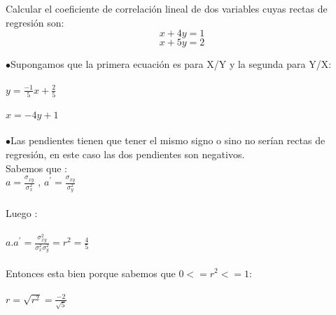 \problem
Calcular el coeficiente de correlaci\'on lineal de dos variables cuyas rectas de regresi\'on son:
$$
x + 4y = 1
$$
$$
x + 5y = 2
$$
	
	$\bullet$Supongamos que la primera ecuación es para X/Y y la segunda para Y/X:\\ \\
	$y = \frac{-1}{5}x + \frac{2}{5}$\\ \\
	$x = -4y + 1$\\ \\
	$\bullet$Las pendientes tienen que tener el mismo signo o sino no serían rectas de regresión, en este caso las dos pendientes son negativos.\\ 
	Sabemos que : \\
	
	
	$a = \frac{\sigma_{xy}}{\sigma_{x}^{2}} $ , $a^{'} = \frac{\sigma_{xy}}{\sigma_{y}^{2}} $\\ \\
	Luego :\\ \\
	$a.a^{'} = \frac{\sigma_{xy}^{2}}{\sigma_{x}^{2}\sigma_{y}^{2}} = r^{2} = \frac{4}{5} $\\ \\
	Entonces esta bien porque sabemos que $ 0 <= r^{2} <= 1 $: \\ \\
	$r = \sqrt{ r^{2}}= \frac{-2}{\sqrt{5}} $

